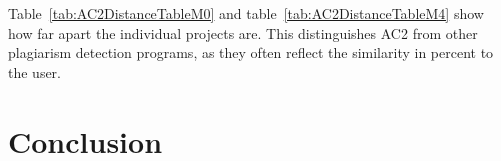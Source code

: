\documentclass[a4paper, 11pt]{article}
\renewcommand{\\}{\vspace*{0.5\baselineskip} \newline}
\begin{document}
Table~\ref{tab:AC2DistanceTableM0} and table~\ref{tab:AC2DistanceTableM4} show how far apart the individual projects are. This distinguishes AC2 from other plagiarism detection programs, as they often reflect the similarity in percent to the user.

\newpage


\section{Conclusion}

\newpage

\printbibliography[
	heading=bibintoc,
	title={References}
]

\appendix
\end{document}
